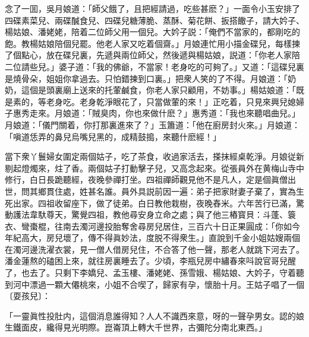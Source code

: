念了一囬，吳月娘道：「師父餓了，且把經請過，吃些甚麽？」一面令小玉安排了四碟素菜兒、兩碟醎食兒、四碟兒糖薄脆、蒸酥、菊花餅、扳搭饊子，請大妗子、楊姑娘、潘姥姥，陪着二位師父用一個兒。大妗子説：「俺們不當家的，都剛吃的飽。教楊姑娘陪個兒罷。他老人家又吃着個齋。」月娘連忙用小描金碟兒，每樣揀了個點心，放在碟兒裏，先遞與兩位師父，然後遞與楊姑娘，説道：「你老人家陪二位請些兒。」婆子道：「我的佛爺，不當家！老身吃的可夠了。」又道：「這碟兒裏是燒骨朵，姐姐你拿過去。只怕錯揀到口裏。」把衆人笑的了不得。月娘道：「奶奶，這個是頭裏廟上送來的托葷鹹食，你老人家只顧用，不妨事。」楊姑娘道：「既是素的，等老身吃。老身乾淨眼花了，只當做葷的來！」正吃着，只見來興兒媳婦子惠秀走來。月娘道：「賊臭肉，你也來做什麽？」惠秀道：「我也來聽唱曲兒。」月娘道：「儀門關着，你打那裏進來了？」玉簫道：「他在廚房封火來。」月娘道：「嗔道恁弄的鼻兒烏嘴兒黑的，成精鼓搗，來聽什麽經！」

當下衆丫鬟婦女圍定兩個姑子，吃了茶食，收過家活去，搽抹經桌乾淨。月娘従新剔起燈燭來，炷了香。兩個姑子打動擊子兒，又高念起來。從張員外在黄梅山寺中修行，白日長跪聽經，夜晚參禪打坐。四祖禪師觀見他不是凡人，定是個眞僧出世，問其鄉貫住處，姓甚名誰。員外具説前因一遍：弟子把家財妻子棄了，實為生死出家。四祖收留座下，做了徒弟。白日教他栽樹，夜晚舂米。六年苦行已滿，驚動護法韋馱尊天，驚覺四祖，教他尋安身立命之處；與了他三樁寳貝：斗蓬、簑衣、彎棗棍，往南去濁河邊投胎奪舍尋房兒居住，三百六十日正果圓成：「你如今年紀高大，房兒壞了，傳不得眞妙法，度脱不得衆生。」直說到千金小姐姑嫂兩個在濁河邊洗濯衣裳，見一僧人借房兒住，不合答了他一聲，那老人就跳下河去了。潘金蓮熬的磕困上來，就往房裏睡去了。少頃，李瓶兒房中繡春來呌說官哥兒醒了，也去了。只剩下李嬌兒、孟玉樓、潘姥姥、孫雪娥、楊姑娘、大妗子，守着聽到河中漂過一顆大僊桃來，小姐不合喫了，歸家有孕，懷胎十月。王姑子唱了一個〔耍孩兒〕：

\begin{myquote}
「一靈眞性投肚内，這個消息誰得知？人人不識西來意，呀的一聲孕男女。認的娘生鐵面皮，纔得見光明際。崑崙頂上轉大千世界，古彌陀分南北東西。」

\end{myquote}

